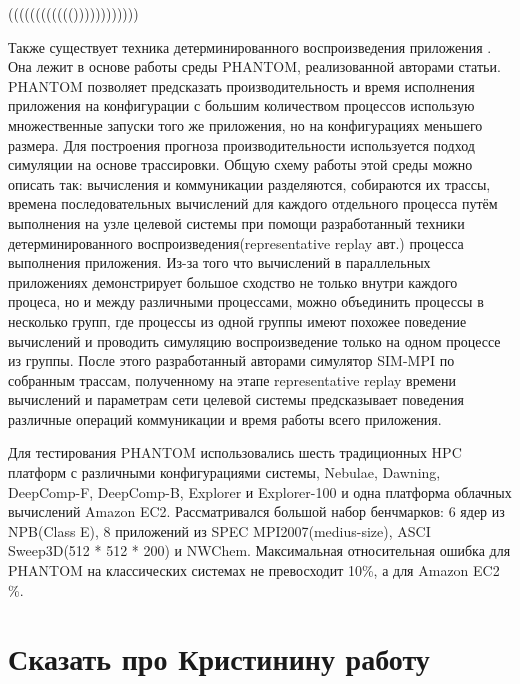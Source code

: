 	(((((((((((())))))))))))
	
	Также существует техника детерминированного воспроизведения приложения \cite{representative_replay}. Она лежит в основе работы среды PHANTOM, реализованной авторами статьи. PHANTOM позволяет предсказать производительность и время исполнения приложения на конфигурации с большим количеством процессов использую множественные запуски того же приложения, но на конфигурациях меньшего размера. Для построения прогноза производительности используется подход симуляции на основе трассировки. Общую схему работы этой среды можно описать так: вычисления и коммуникации разделяются, собираются их трассы, времена последовательных вычислений для каждого отдельного процесса путём выполнения на узле целевой системы при помощи разработанный техники детерминированного воспроизведения(representative replay авт.) процесса выполнения приложения. Из-за того что вычислений в параллельных приложениях демонстрирует большое сходство не только внутри каждого процеса, но и между различными процессами, можно объединить процессы в несколько групп, где процессы из одной группы имеют похожее поведение вычислений и проводить симуляцию воспроизведение только на одном процессе из группы. После этого разработанный авторами симулятор SIM-MPI по собранным трассам, полученному на этапе representative replay времени вычислений и параметрам сети целевой системы предсказывает поведения различные операций коммуникации и время работы всего приложения.

	Для тестирования PHANTOM использовались шесть традиционных HPC платформ с различными конфигурациями системы, Nebulae, Dawning, DeepComp-F, DeepComp-B, Explorer и Explorer-100 и одна платформа облачных вычислений Amazon EC2. Рассматривался большой набор бенчмарков: 6 ядер из NPB(Class E), 8 приложений из SPEC MPI2007(medius-size), ASCI Sweep3D(512 * 512 * 200) и NWChem. Максимальная относительная ошибка для PHANTOM на классических системах не превосходит 10\%, а для Amazon EC2 \%.


	\section{Сказать про Кристинину работу}
\clearpage


